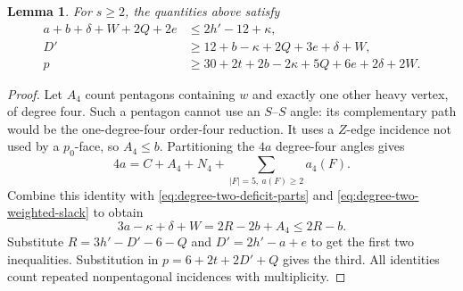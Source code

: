 \documentclass[11pt]{article}
\newtheorem{lemma}[theorem]{Lemma}
\theoremstyle{remark}
\numberwithin{equation}{section}
\numberwithin{table}{section}
\begin{document}
\begin{lemma}\label{lem:degree-two-master}
For $s\ge2$, the quantities above satisfy
\begin{align}
 a+b+\delta+W+2Q+2e&\le2h'-12+\kappa,
 \label{eq:degree-two-master}\\
 D'&\ge12+b-\kappa+2Q+3e+\delta+W,
 \label{eq:degree-two-excess-master}\\
 p&\ge30+2t+2b-2\kappa+5Q+6e+2\delta+2W.
 \label{eq:degree-two-face-master}
\end{align}
\end{lemma}
\begin{proof}
Let $A_4$ count pentagons containing $w$ and exactly one other heavy
vertex, of degree four. Such a pentagon cannot use an $S$--$S$ angle:
its complementary path would be the one-degree-four order-four
reduction. It uses a $Z$-edge incidence not used by a $p_0$-face, so
$A_4\le b$. Partitioning the $4a$ degree-four angles gives
\[
 4a=C+A_4+N_4+\sum_{|F|=5,\ a(F)\ge2}a_4(F).
\]
Combine this identity with \eqref{eq:degree-two-deficit-parts} and
\eqref{eq:degree-two-weighted-slack} to obtain
\[
 3a-\kappa+\delta+W=2R-2b+A_4\le2R-b.
\]
Substitute $R=3h'-D'-6-Q$ and $D'=2h'-a+e$ to get the first two
inequalities. Substitution in $p=6+2t+2D'+Q$ gives the third.
All identities count repeated nonpentagonal incidences with
multiplicity.
\end{proof}
\end{document}

